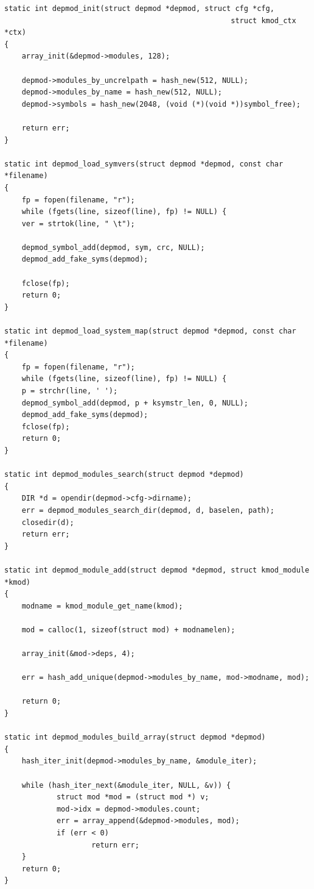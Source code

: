 {\begin{shaded}\begin{verbatim}
static int depmod_init(struct depmod *depmod, struct cfg *cfg,
                                                    struct kmod_ctx *ctx)
{
    array_init(&depmod->modules, 128);

    depmod->modules_by_uncrelpath = hash_new(512, NULL);
    depmod->modules_by_name = hash_new(512, NULL);
    depmod->symbols = hash_new(2048, (void (*)(void *))symbol_free);

    return err;
}

static int depmod_load_symvers(struct depmod *depmod, const char *filename)
{
    fp = fopen(filename, "r");
    while (fgets(line, sizeof(line), fp) != NULL) {
    ver = strtok(line, " \t");

    depmod_symbol_add(depmod, sym, crc, NULL);
    depmod_add_fake_syms(depmod);

    fclose(fp);
    return 0;
}

static int depmod_load_system_map(struct depmod *depmod, const char *filename)
{
    fp = fopen(filename, "r");
    while (fgets(line, sizeof(line), fp) != NULL) {
    p = strchr(line, ' ');
    depmod_symbol_add(depmod, p + ksymstr_len, 0, NULL);
    depmod_add_fake_syms(depmod);
    fclose(fp);
    return 0;
}

static int depmod_modules_search(struct depmod *depmod)
{
    DIR *d = opendir(depmod->cfg->dirname);
    err = depmod_modules_search_dir(depmod, d, baselen, path);
    closedir(d);
    return err;
}

static int depmod_module_add(struct depmod *depmod, struct kmod_module *kmod)
{
    modname = kmod_module_get_name(kmod);

    mod = calloc(1, sizeof(struct mod) + modnamelen);

    array_init(&mod->deps, 4);

    err = hash_add_unique(depmod->modules_by_name, mod->modname, mod);

    return 0;
}

static int depmod_modules_build_array(struct depmod *depmod)
{
    hash_iter_init(depmod->modules_by_name, &module_iter);

    while (hash_iter_next(&module_iter, NULL, &v)) {
            struct mod *mod = (struct mod *) v;
            mod->idx = depmod->modules.count;
            err = array_append(&depmod->modules, mod);
            if (err < 0)
                    return err;
    }
    return 0;
}


\end{verbatim}
\end{shaded}}
